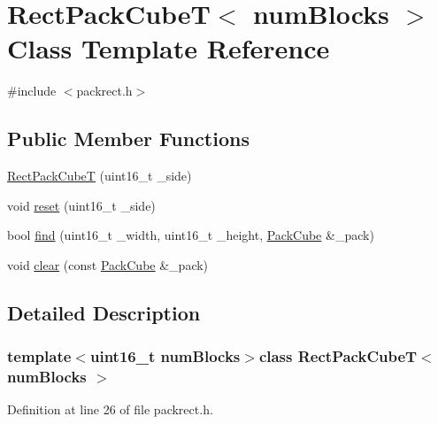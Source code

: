 \hypertarget{singleton_rect_pack_cube_t}{\section{Rect\+Pack\+Cube\+T$<$ num\+Blocks $>$ Class Template Reference}
\label{singleton_rect_pack_cube_t}
}


{\ttfamily \#include $<$packrect.\+h$>$}

\subsection*{Public Member Functions}
\begin{DoxyCompactItemize}
\item 
\hyperlink{singleton_rect_pack_cube_t_a83a9122d7bb6ce585a0893e80cbd8632}{Rect\+Pack\+Cube\+T} (uint16\+\_\+t \+\_\+side)
\item 
void \hyperlink{singleton_rect_pack_cube_t_ad55006e523310a318d89a53248b10c1f}{reset} (uint16\+\_\+t \+\_\+side)
\item 
bool \hyperlink{singleton_rect_pack_cube_t_ad3bb4a0c86d183e08f843515d825fd23}{find} (uint16\+\_\+t \+\_\+width, uint16\+\_\+t \+\_\+height, \hyperlink{struct_pack_cube}{Pack\+Cube} \&\+\_\+pack)
\item 
void \hyperlink{singleton_rect_pack_cube_t_ac6819d70e26c5386b1295f18fced0ed3}{clear} (const \hyperlink{struct_pack_cube}{Pack\+Cube} \&\+\_\+pack)
\end{DoxyCompactItemize}


\subsection{Detailed Description}
\subsubsection*{template$<$uint16\+\_\+t num\+Blocks$>$class Rect\+Pack\+Cube\+T$<$ num\+Blocks $>$}



Definition at line 26 of file packrect.\+h.



